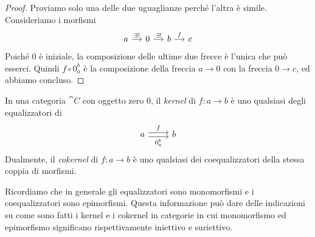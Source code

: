 \begin{proof}
  Proviamo solo una delle due uguaglianze perché l'altra è
  simile. Consideriamo i morfismi
  \[
    \begin{tikzcd}[column sep=small]
      a \ar["{\exists!}", r] & 0 \ar["{\exists!}", r] & b \ar["f", r] & c
    \end{tikzcd}
  \]
  Poiché \(0\) è iniziale, la composizione delle ultime due frecce è
  l'unica che può esserci. Quindi \(f \circ 0_a^b\) è la composizione
  della freccia \(a \to 0\) con la freccia \(0 \to c\), ed abbiamo
  concluso.
\end{proof}

\begin{definition}
  In una categoria \(\cat C\) con oggetto zero \(0\), il {\em kernel}
  di \(f : a \to b\) è uno qualsiasi degli equalizzatori di
  \[
    \begin{tikzcd}
      a \ar["f", shift left, r] \ar["{0_a^b}", shift right, swap, r] &
      b
    \end{tikzcd}
  \]
  Dualmente, il {\em cokernel} di \(f : a \to b\) è uno qualsiasi dei
  coequalizzatori della stessa coppia di morfismi.
\end{definition}

\begin{remark}
  Ricordiamo che in generale gli equalizzatori sono monomorfismi e i
  coequalizzatori sono epimorfismi. Questa informazione può dare delle
  indicazioni su come sono fatti i kernel e i cokernel in categorie in
  cui monomorfismo ed epimorfismo significano rispettivamente
  iniettivo e suriettivo.
\end{remark}

